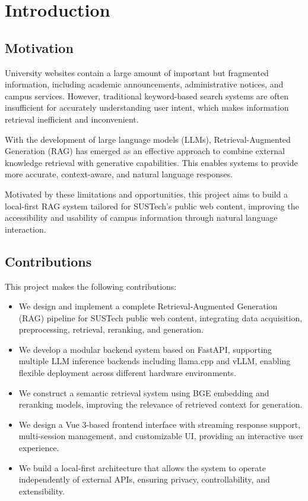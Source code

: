 \chapter{Introduction}
\section{Motivation}

University websites contain a large amount of important but fragmented information, including academic announcements, administrative notices, and campus services. However, traditional keyword-based search systems are often insufficient for accurately understanding user intent, which makes information retrieval inefficient and inconvenient.

With the development of large language models (LLMs), Retrieval-Augmented Generation (RAG) has emerged as an effective approach to combine external knowledge retrieval with generative capabilities. This enables systems to provide more accurate, context-aware, and natural language responses.

Motivated by these limitations and opportunities, this project aims to build a local-first RAG system tailored for SUSTech's public web content, improving the accessibility and usability of campus information through natural language interaction.


 \section{Contributions}\label{sec:motiv}
 This project makes the following contributions:

\begin{itemize}
    \item We design and implement a complete Retrieval-Augmented Generation (RAG) pipeline for SUSTech public web content, integrating data acquisition, preprocessing, retrieval, reranking, and generation.

    \item We develop a modular backend system based on FastAPI, supporting multiple LLM inference backends including llama.cpp and vLLM, enabling flexible deployment across different hardware environments.

    \item We construct a semantic retrieval system using BGE embedding and reranking models, improving the relevance of retrieved context for generation.

    \item We design a Vue 3-based frontend interface with streaming response support, multi-session management, and customizable UI, providing an interactive user experience.

    \item We build a local-first architecture that allows the system to operate independently of external APIs, ensuring privacy, controllability, and extensibility.
\end{itemize}

